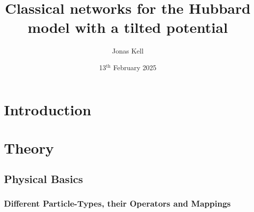 \documentclass[
headings=optiontohead,              %
12pt,                               %
DIV=13,                             %
twoside=false,                      %
open=right,                         %
BCOR=00mm,                          %
toc=bibliographynumbered            %
]{scrreport}
\title{Classical networks for the Hubbard model with a tilted potential}
\author{Jonas Kell}
\date{13$^\text{th}$ February 2025}
\begin{document}
\thispagestyle{empty}                           %
\cleardoublepage                                %
\pagestyle{scrheadings}                         %
\renewcommand{\contentsname}{Table of Contents} %
\tableofcontents                                %
\cleardoublepage                                %

\clearpairofpagestyles
\ihead{\leftmark}
\ohead{\Ifstr{\leftmark}{\rightmark}{}{\rightmark}}
\cfoot*{\pagemark}

\renewcommand{\theequation}{\arabic{equation}} %

\chapter{Introduction}
\label{sec:introduction}

\FloatBarrier

\chapter{Theory}
\label{sec:theory}

\FloatBarrier

    \section{Physical Basics}
    \label{sec:theory-physics}
    
    \FloatBarrier
        \subsection{Different Particle-Types, their Operators and Mappings}
        \label{sec:particles}
        
        \FloatBarrier
\end{document}
